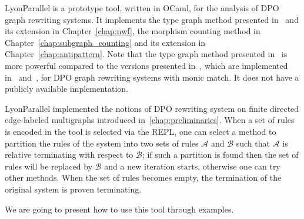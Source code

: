 LyonParallel is a prototype tool, written in OCaml, for the analysis of DPO graph rewriting systems.
It implements the type graph method presented in~\cite{endrullis2024generalized_icgt} and its extension in Chapter~\ref{chap:nwf}, the morphism counting method in Chapter~\ref{chap:subgraph_counting} and its extension in Chapter~\ref{chap:antipattern}. Note that the type graph method presented in~\cite{endrullis2024generalized_icgt} is more powerful compared to the versions presented in~\cite{zantema2014termination,bruggink2014termination,bruggink2015proving}, which are implemented in~\cite{TORPAcyc} and~\cite{grez}, for DPO graph rewriting systems with monic match. It does not have a publicly available implementation. 


LyonParallel implemented the notions of DPO rewriting system on finite directed edge-labeled multigraphs introduced in~\autoref{chap:preliminaries}. When a set of rules is encoded in the tool is selected via the REPL, one can select a method to partition the rules of the system into two sets of rules $\mathcal{A}$ and $\mathcal{B}$ such that $\mathcal{A}$ is relative terminating with respect to $\mathcal{B}$; if such a partition is found then the set of rules will be replaced by $\mathcal{B}$ and a new iteration starts, otherwise one can try other methods. When the set of rules becomes empty, the termination of the original system is proven terminating.

We are going to present how to use this tool through examples.

